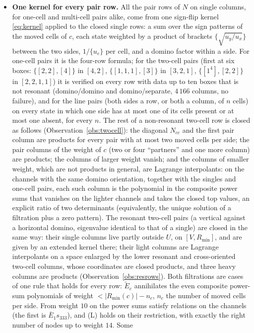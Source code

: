 \documentclass[11pt]{article}
\newcommand{\Et}{\widetilde{E}}
\begin{document}
\begin{itemize}
\item \textbf{One kernel for every pair row.}  All the pair rows of $N$ on single columns, for one-cell and
multi-cell pairs alike, come from one sign-flip kernel \eqref{eq:kernel} applied to the closed single rows: a sum over
the sign patterns of the moved cells of $c$, each state weighted by a product of brackets $\{\sqrt{u_y/u_x}\}$ between
the two sides, $1/\{u_e\}$ per cell, and a domino factor within a side.  For one-cell pairs it is the four-row formula;
for the two-cell pairs (first at six boxes: $\{[2,2],[4]\}$ in $[4,2]$, $\{[1,1,1],[3]\}$ in $[3,2,1]$,
$\{[1^4],[2,2]\}$ in $[2,2,1,1]$) it is verified on every row with data up to ten boxes that is not resonant
(domino/domino and domino/separate, $4\,166$ columns, no failure), and for the line pairs (both sides a row, or both a
column, of $n$ cells) on every state in which one side has at most one of its cells present or at most one absent, for
every $n$.  The rest of a
non-resonant two-cell row is closed as follows (Observation~\ref{obs:twocell}): the diagonal $N_{cc}$ and the first pair
column are products for every pair with at most two moved cells per side; the pair columns of the weight of $c$ (two or
four ``partners'' and one more column) are products; the columns of larger weight vanish; and the columns of smaller
weight, which are not products in general, are Lagrange interpolants: on the channels with the same domino orientation,
together with the singles and one-cell pairs, each such column is the polynomial in the composite power sums that
vanishes on the lighter channels and takes the closed top values, an explicit ratio of two determinants (equivalently,
the unique solution of a filtration plus a zero pattern).  The resonant two-cell pairs (a vertical against a horizontal domino,
eigenvalue identical to that of a single) are closed in the same way: their single columns live partly outside $U$, on
$[V,R_{\min}]$, and are given by an extended kernel there; their light columns are Lagrange interpolants on a space
enlarged by the lower resonant and cross-oriented two-cell columns, whose coordinates are closed products, and three
heavy columns are products (Observation~\ref{obs:resrows}).  Both filtrations are cases of one rule that holds for every
row: $\Et_c$ annihilates the even composite power-sum polynomials of weight $<|R_{\min}(c)|-n_c$, $n_c$ the number of
moved cells per side.  From weight $10$ on the power sums satisfy relations on the channels (the first is
$\bar E_1s_{333}$), and (L) holds on their restriction, with exactly the right number of nodes up to weight $14$.  Some

\end{itemize}
\end{document}
